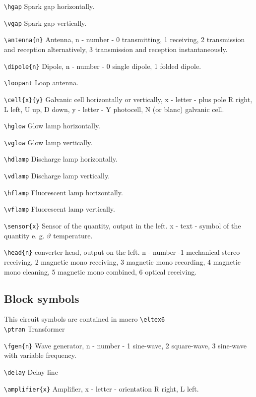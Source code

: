 \noindent
\verb?\hgap?
Spark gap horizontally.

\noindent
\verb?\vgap?
Spark gap vertically.


\noindent
\verb?\antenna{n}?
Antenna, n - number - 0 transmitting, 1 receiving, 2 transmission
and reception alternatively, 3 transmission and reception
instantaneously.

\noindent
\verb?\dipole{n}?
Dipole, n - number - 0 single dipole, 1 folded dipole.

\noindent
\verb?\loopant?
Loop antenna.

\noindent
\verb?\cell{x}{y}?
Galvanic cell horizontally or vertically,
x - letter - plus pole R right, L left,
U up, D down, y - letter - Y photocell, N (or blanc) galvanic cell.


\noindent
\verb?\hglow?
Glow lamp horizontally.


\noindent
\verb?\vglow?
Glow lamp vertically.

\noindent
\verb?\hdlamp?
Discharge lamp horizontally.

\noindent
\verb?\vdlamp?
Discharge lamp vertically.

\noindent
\verb?\hflamp?
Fluorescent lamp horizontally.

\noindent
\verb?\vflamp?
Fluorescent lamp vertically.


\noindent
\verb?\sensor{x}?
Sensor of the quantity, output in the left. x - text - symbol of the
quantity e. g. $\vartheta$ temperature.

\noindent
\verb?\head{n}?
converter head, output on the left. n - number -1 mechanical stereo
receiving,
2 magnetic mono receiving, 3 magnetic mono recording,
4 magnetic mono cleaning, 5 magnetic mono combined,
6 optical receiving.


\subsection{Block symbols}

This circuit symbols are contained in macro \verb?\eltex6? \\

\noindent
\verb?\ptran?
Transformer

\noindent
\verb?\fgen{n}?
Wave generator, n - number - 1 sine-wave, 2 square-wave, 3 sine-wave
with variable frequency.

\noindent
\verb?\delay?
Delay line

\noindent
\verb?\amplifier{x}?
Amplifier, x - letter - orientation R right, L left.

